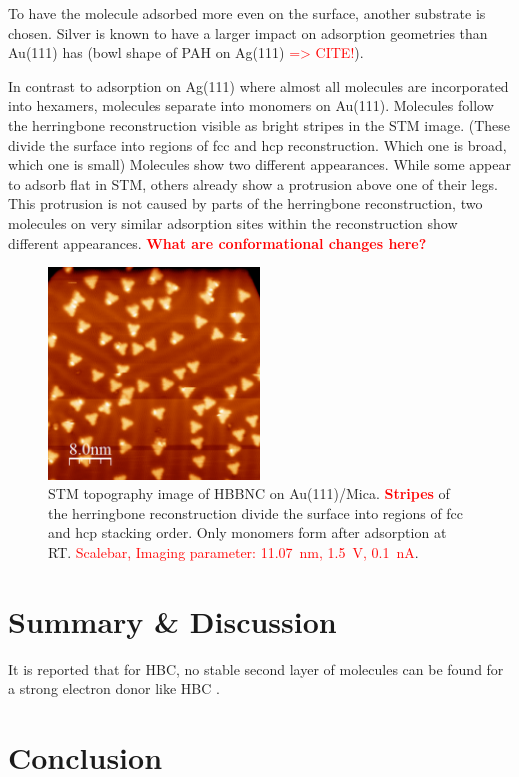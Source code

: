 To have the molecule adsorbed more even on the surface, another substrate is chosen. Silver is known to have a larger impact on adsorption geometries than Au(111) has (bowl shape of PAH on Ag(111) \textcolor{red}{=> CITE!}).

In contrast to adsorption on Ag(111) where almost all molecules are incorporated into hexamers, molecules separate into monomers on Au(111). Molecules follow the herringbone reconstruction visible as bright stripes in the STM image. 
(These divide the surface into regions of fcc and hcp reconstruction.
Which one is broad, which one is small)
Molecules show two different appearances. While some appear to adsorb flat in STM, others already show a protrusion above one of their legs. This protrusion is not caused by parts of the herringbone reconstruction, two molecules on very similar adsorption sites within the reconstruction show different appearances.
\textcolor{red}{\textbf{What are conformational changes here?}}

\begin{figure}[] \centering
	\includegraphics[width=0.5\textwidth]{./images/hbbnc-au-111-rt}
	\caption{STM topography image of HBBNC on Au(111)/Mica. \textcolor{red}{\textbf{Stripes}} of the herringbone reconstruction divide the surface into regions of fcc and hcp stacking order. Only monomers form after adsorption at RT. \textcolor{red}{Scalebar, Imaging parameter: \SI{11.07}{\nano \meter}, \SI{1.5}{\volt}, \SI{0.1}{\nano \ampere}}.}
	\label{}
\end{figure}

\section{Summary \& Discussion}
It is reported that for HBC, no stable second layer of molecules can be found for a strong electron donor like HBC \cite{de_feyter_two-dimensional_2003}.

\section{Conclusion}